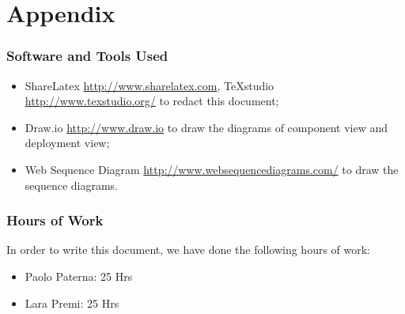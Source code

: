\section{Appendix}
\subsubsection{Software and Tools Used}
	\begin{itemize}
		\item ShareLatex \url{http://www.sharelatex.com}, TeXstudio \url{http://www.texstudio.org/} to redact this document;
		\item Draw.io \url{http://www.draw.io} to draw the diagrams of component view and deployment view;
		\item Web Sequence Diagram \url{http://www.websequencediagrams.com/} to draw the sequence diagrams.
	\end{itemize}
\subsubsection{Hours of Work}
	In order to write this document, we have done the following hours of work:
	\begin{itemize}
		\item Paolo Paterna: 25 Hrs
		\item Lara Premi: 25 Hrs
	\end{itemize}